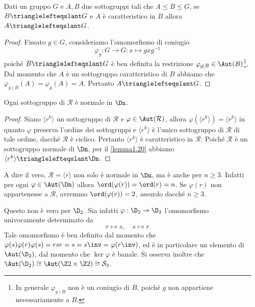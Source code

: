 \documentclass[11pt]{scrartcl}
\begin{document}
	\begin{lemma}
		\label{lemma1.20}
		Dati un gruppo $G$ e $A, B$ due sottogruppi tali che $A \leqslant B \leqslant G$,
		se $B\trianglelefteqslant G$ e $A$ è caratteristico in $B$ allora 
		$A \trianglelefteqslant G$.
	\end{lemma}
	
	\begin{proof}
		Fissato $g \in G$, consideriamo l'omomorfismo di coniugio 
		\[
		\varphi_g : G\longrightarrow G : x\longmapsto gxg^{-1}
		\] poiché 
		$B\trianglelefteqslant G$ è ben definita la restrizione $\varphi_{g\mid B} \in \Aut(B)$\footnote{
			In generale $\varphi_{g\mid B}$ non è un 
			coniugio di $B$, poiché $g$ non appartiene necessariamente a $B$.
		}. 
		Dal momento che $A$ è
		un sottogruppo caratteristico di $B$ abbiamo che $\varphi_{g\mid B}(A) =
		\varphi_g(A) = A$.
		Pertanto $A \trianglelefteqslant G$.
	\end{proof}
	
	
	\begin{corollary}
		Ogni sottogruppo di $\mathcal{R}$ è normale in $\Dn$.
	\end{corollary}
	
	\begin{proof}
		Siano $\langle r^k\rangle$ un sottogruppo di $\mathcal{R}$ e $\varphi
		\in \Aut(\mathcal{R})$, allora $\varphi(\langle r^k\rangle) = \langle r^k\rangle$
		in quanto $\varphi$ preserva l'ordine dei sottogruppi e $\langle r^k\rangle$
		è l'unico sottogruppo di $\mathcal{R}$ di tale ordine, dacché $\mathcal{R}$ è ciclico.
		Pertanto $\langle r^k\rangle$
		è caratteristico in $\mathcal{R}$. Poiché $\mathcal{R}$ è un sottogruppo
		normale di $\Dn$, per il \autoref{lemma1.20}
		abbiamo $\langle r^k\rangle\trianglelefteqslant \Dn$.
	\end{proof}
	
	\begin{remark}
		A dire il vero, $\mathcal{R} = \langle r \rangle$ non solo è normale in $\Dn$,
		ma è anche per $n \geq 3$.
		Infatti per ogni $\varphi \in \Aut(\Dn)$ allora
		$\ord(\varphi(r)) = \ord(r) = n$.
		Se $\varphi(r)$ non appartenesse a $\mathcal{R}$, avremmo $\ord(\varphi(r)) = 2$,
		assurdo dacché $n \geq 3$. \medskip

		Questo non è vero per $\D_2$. Sia infatti $\varphi : \D_2 \to \D_2$ l'omomorfismo
		univocamente determinato da
		\[ r \mapsto s, \quad s \mapsto r \]
		Tale omomorfismo è ben definito dal momento che $\varphi(s) \varphi(r) \varphi(s) =
		r s r = s = s\inv = \varphi(r\inv)$, ed è in particolare un elemento di $\Aut(\D_2)$,
		dal momento che $\ker \varphi$ è banale. Si osserva inoltre che $\Aut(\D_2) \cong \Aut(\Z2 \times \Z2) \cong \mathcal{S}_3$.
	\end{remark}
	
\end{document}
